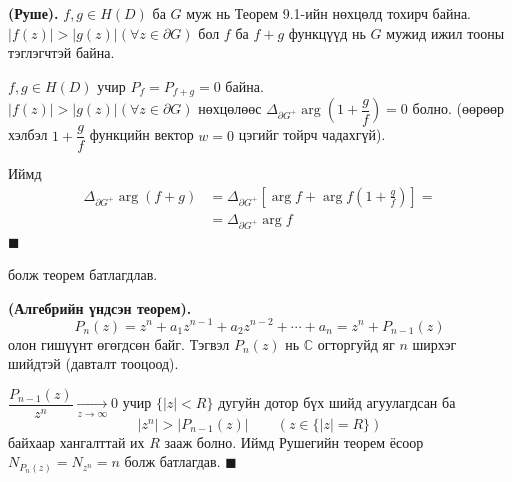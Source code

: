 \begin{thm}
\textbf{ (Руше).} $f,g\in H(D)$ ба $G$ муж нь Теорем 9.1-ийн нөхцөлд тохирч байна. $|f(z)|>|g(z)| (\forall z\in\partial G)$ бол $f$ ба $f+g$ функцүүд нь $G$ мужид ижил тооны тэглэгчтэй байна. 
\end{thm}
\begin{prf}
$f,g\in H(D)$ учир $P_f=P_{f+g}=0$ байна. \\ $|f(z)|>|g(z)| (\forall z\in \partial G)$ нөхцөлөөс $\Delta_{\partial G^+}\arg \left(1+\dfrac{g}{f}\right) =0$  болно. (өөрөөр хэлбэл $1+\dfrac{g}{f}$ функцийн вектор $w=0$ цэгийг тойрч чадахгүй).

Иймд 
\begin{align*}
    \Delta_{\partial G^+}\arg (f+g)&=\Delta_{\partial G^+}\left[\arg f+\arg f\left(1+\frac{g}{f}\right)\right]=\\
    &=\Delta_{\partial G^+}\arg f
\end{align*}
\hfill $\blacksquare$\end{prf}
болж теорем батлагдлав.
\begin{cor}
\textbf{(Алгебрийн үндсэн теорем).} 
$$P_n(z)=z^n+a_1z^{n-1}+a_2z^{n-2}+\cdots +a_n=z^n+P_{n-1}(z)$$
олон гишүүнт өгөгдсөн байг. Тэгвэл $P_n(z)$ нь $\mathbb{C}$ огторгуйд яг $n$ ширхэг шийдтэй (давталт тооцоод).
\end{cor}
\begin{prf}
$\dfrac{P_{n-1}(z)}{z^n}\xrightarrow[z\rightarrow \infty]{}0$ учир $\{|z|<R\}$ дугуйн дотор бүх шийд агуулагдсан ба $$|z^n|>|P_{n-1}(z)| \qquad (z\in\{|z|=R\})$$ байхаар хангалттай их $R$ зааж болно. Иймд Рушегийн теорем ёсоор $N_{P_n(z)}=N_{z^n}=n$ болж батлагдав.
\hfill $\blacksquare$\end{prf}
